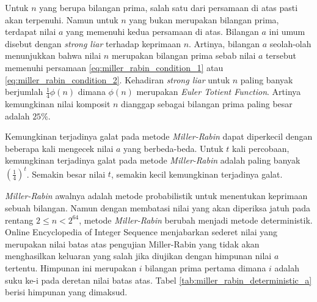 Untuk $ n $ yang berupa bilangan prima, salah satu dari persamaan di atas pasti akan terpenuhi. Namun untuk $ n $ yang bukan merupakan bilangan prima, terdapat nilai $ a $ yang memenuhi kedua persamaan di atas. Bilangan $ a $ ini umum disebut dengan \textit{strong liar} terhadap keprimaan $ n $. Artinya, bilangan $ a $ seolah-olah menunjukkan bahwa nilai $ n $ merupakan bilangan prima sebab nilai $ a $ tersebut memenuhi persamaan \eqref{eq:miller_rabin_condition_1} atau \eqref{eq:miller_rabin_condition_2}. Kehadiran \textit{strong liar} untuk $ n $ paling banyak berjumlah $ \frac{1}{4} \phi(n) $ dimana $ \phi(n) $ merupakan \textit{Euler Totient Function}. Artinya kemungkinan nilai komposit $ n $ dianggap sebagai bilangan prima paling besar adalah $ 25\% $. \cite{hac_publickey}

Kemungkinan terjadinya galat pada metode \textit{Miller-Rabin} dapat diperkecil dengan beberapa kali mengecek nilai $ a $ yang berbeda-beda. Untuk $ t $ kali percobaan, kemungkinan terjadinya galat pada metode \textit{Miller-Rabin} adalah paling banyak $ (\frac{1}{4})^{t} $. Semakin besar nilai $ t $, semakin kecil kemungkinan terjadinya galat. \cite{hac_publickey}

\textit{Miller-Rabin} awalnya adalah metode probabilistik untuk menentukan keprimaan sebuah bilangan. Namun dengan membatasi nilai yang akan diperiksa jatuh pada rentang $ 2 \leq n < 2^{64} $, metode \textit{Miller-Rabin} berubah menjadi metode deterministik. Online Encyclopedia of Integer Sequence \cite{oeis_mrabin_limit} menjabarkan sederet nilai yang merupakan nilai batas atas pengujian Miller-Rabin yang tidak akan menghasilkan keluaran yang salah jika diujikan dengan himpunan nilai $ a $ tertentu. Himpunan ini merupakan $ i $ bilangan prima pertama dimana $ i $ adalah suku ke-i pada deretan nilai batas atas. Tabel \ref{tab:miller_rabin_deterministic_a} berisi himpunan yang dimaksud.

